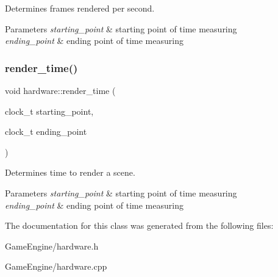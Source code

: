 Determines frames rendered per second. 


\begin{DoxyParams}{Parameters}
{\em starting\+\_\+point} & starting point of time measuring \\
\hline
{\em ending\+\_\+point} & ending point of time measuring \\
\hline
\end{DoxyParams}
\mbox{\label{classhardware_ad6c6d0db2e613e2356ac47eb823f3e61}} 
\subsubsection{render\_time()}
{\footnotesize\ttfamily void hardware\+::render\+\_\+time (\begin{DoxyParamCaption}\item[{clock\+\_\+t}]{starting\+\_\+point,  }\item[{clock\+\_\+t}]{ending\+\_\+point }\end{DoxyParamCaption})\hspace{0.3cm}{\ttfamily [static]}}



Determines time to render a scene. 


\begin{DoxyParams}{Parameters}
{\em starting\+\_\+point} & starting point of time measuring \\
\hline
{\em ending\+\_\+point} & ending point of time measuring \\
\hline
\end{DoxyParams}


The documentation for this class was generated from the following files\+:\begin{DoxyCompactItemize}
\item 
Game\+Engine/hardware.\+h\item 
Game\+Engine/hardware.\+cpp\end{DoxyCompactItemize}
